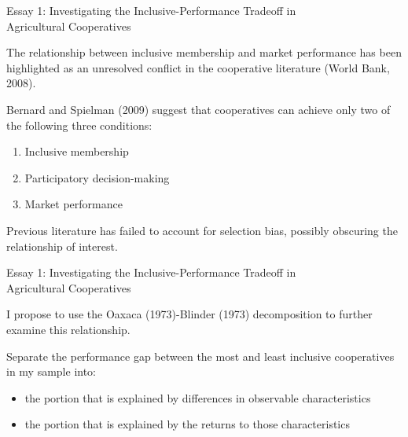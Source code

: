 \documentclass[aspectratio=169]{beamer}
\newenvironment{wideitemize}{\itemize\addtolength{\itemsep}{10pt}}{\enditemize}
\begin{document}
\begin{frame}{Essay 1: Investigating the Inclusive-Performance Tradeoff in \\ \hspace{1.7cm} Agricultural Cooperatives}

    \begin{wideitemize}
        \item The relationship between inclusive membership and market performance has been highlighted as an unresolved conflict in the cooperative literature (World Bank, 2008). 
        \item Bernard and Spielman (2009) suggest that cooperatives can achieve only two of the following three conditions: \vspace{.25cm}
            \begin{enumerate}
                \item Inclusive membership \vspace{.25cm}
                \item Participatory decision-making \vspace{.25cm}
                \item Market performance
            \end{enumerate}
        \item Previous literature has failed to account for selection bias, possibly obscuring the relationship of interest. 
    \end{wideitemize}
\end{frame}

\begin{frame}{Essay 1: Investigating the Inclusive-Performance Tradeoff in \\ \hspace{1.7cm} Agricultural Cooperatives}
    \begin{wideitemize}
        \item I propose to use the Oaxaca (1973)-Blinder (1973) decomposition to further examine this relationship. 
        \item Separate the performance gap between the most and least inclusive cooperatives in my sample into: \vspace{.25cm}
            \begin{itemize}
                \item the portion that is explained by differences in observable characteristics \vspace{.25cm}
                \item the portion that is explained by the returns to those characteristics
            \end{itemize}
    \end{wideitemize}
\end{frame}
\end{document}

